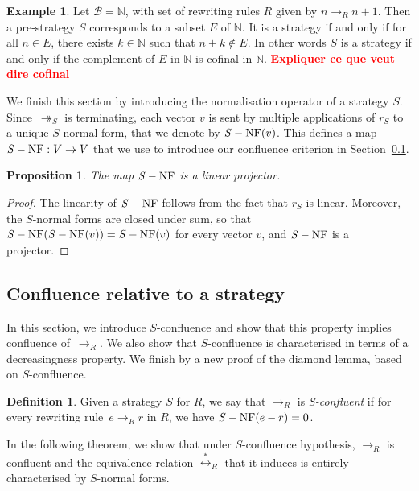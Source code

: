 \documentclass[10pt]{easychair}
\newtheorem{proposition}[theorem]{Proposition}
\theoremstyle{definition}
\newtheorem{definition}[theorem]{Definition}
\newtheorem{example}[theorem]{Example}
\newcommand\todo[1]{{\bf\textcolor{red}{#1}}}
\newcommand\basis{\mathscr{B}}
\newcommand\rewR{\to_R}
\newcommand\rewS{\twoheadrightarrow_S}
\newcommand\equivR{\overset{*}{\leftrightarrow}_R}
\DeclareMathOperator{\SNF}{{\it S}-NF}
\begin{document}
\begin{example}\label{ex:case_N}
  Let $\basis = \mathbb N$, with set of rewriting rules $R$ given by
  $n \rewR n+1$. Then a pre-strategy $S$ corresponds to a subset $E$ of
  $\mathbb N$. It is a strategy if and only if for all $n \in E$, there
  exists $k \in \mathbb N$ such that $n + k \notin E$. In other words $S$
  is a strategy if and only if the complement of $E$ in $\mathbb N$ is
  cofinal in $\mathbb N$. \todo{Expliquer ce que veut dire cofinal}
\end{example}
\smallskip

We finish this section by introducing the normalisation operator of a
strategy $S$. Since~$\rewS$ is terminating, each vector $v$ is sent by
multiple applications of $r_S$ to a unique $S$-normal form, that we
denote by $\SNF(v)$. This defines a map $\SNF:V\to V$ that we use to
introduce our confluence criterion in
Section~\ref{sec:confluence_relative_to_a_strategy}.
\medskip

\begin{proposition}\label{prop:linearity_of_H}
  The map $\SNF$ is a linear projector.
\end{proposition}

\begin{proof}
  The linearity of $\SNF$ follows from the fact that $r_S$ is linear.
  Moreover, the $S$-normal forms are closed under sum, so that
  $\SNF(\SNF(v))=\SNF(v)$ for every vector $v$, and $\SNF$ is a
  projector. 
\end{proof}

\subsection{Confluence relative to a strategy}
\label{sec:confluence_relative_to_a_strategy}

In this section, we introduce $S$-confluence and show that this property
implies confluence of~$\rewR$. We also show that $S$-confluence is
characterised in terms of a decreasingness property. We finish by a new
proof of the diamond lemma, based on $S$-confluence.
\smallskip

\begin{definition}\label{def:standardisation_property}
  Given a strategy $S$ for $R$, we say that $\rewR$ is \emph{S-confluent}
  if for every rewriting rule~$e\rewR r$ in $R$, we have $\SNF(e-r)=0$.
\end{definition}
\smallskip

In the following theorem, we show that under $S$-confluence hypothesis,
$\rewR$ is confluent and the equivalence relation $\equivR$ that it
induces is entirely characterised by $S$-normal forms. 
\medskip
\end{document}
